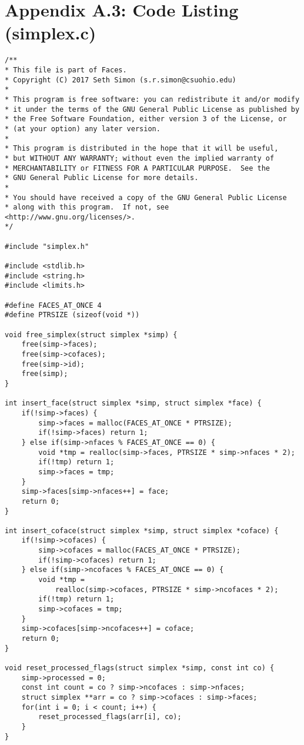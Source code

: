 \documentclass{article}
\begin{document}
\section{Appendix A.3: Code Listing (simplex.c)}
\small
\begin{verbatim}
/**
* This file is part of Faces.
* Copyright (C) 2017 Seth Simon (s.r.simon@csuohio.edu)
* 
* This program is free software: you can redistribute it and/or modify
* it under the terms of the GNU General Public License as published by
* the Free Software Foundation, either version 3 of the License, or
* (at your option) any later version.
* 
* This program is distributed in the hope that it will be useful,
* but WITHOUT ANY WARRANTY; without even the implied warranty of
* MERCHANTABILITY or FITNESS FOR A PARTICULAR PURPOSE.  See the
* GNU General Public License for more details.
* 
* You should have received a copy of the GNU General Public License
* along with this program.  If not, see <http://www.gnu.org/licenses/>.
*/

#include "simplex.h"

#include <stdlib.h>
#include <string.h>
#include <limits.h>

#define FACES_AT_ONCE 4
#define PTRSIZE (sizeof(void *))

void free_simplex(struct simplex *simp) {
    free(simp->faces);
    free(simp->cofaces);
    free(simp->id);
    free(simp);
}

int insert_face(struct simplex *simp, struct simplex *face) {
    if(!simp->faces) {
        simp->faces = malloc(FACES_AT_ONCE * PTRSIZE);
        if(!simp->faces) return 1;
    } else if(simp->nfaces % FACES_AT_ONCE == 0) {
        void *tmp = realloc(simp->faces, PTRSIZE * simp->nfaces * 2);
        if(!tmp) return 1;
        simp->faces = tmp;
    }
    simp->faces[simp->nfaces++] = face;
    return 0;
}

int insert_coface(struct simplex *simp, struct simplex *coface) {
    if(!simp->cofaces) {
        simp->cofaces = malloc(FACES_AT_ONCE * PTRSIZE);
        if(!simp->cofaces) return 1;
    } else if(simp->ncofaces % FACES_AT_ONCE == 0) {
        void *tmp =
            realloc(simp->cofaces, PTRSIZE * simp->ncofaces * 2);
        if(!tmp) return 1;
        simp->cofaces = tmp;
    }
    simp->cofaces[simp->ncofaces++] = coface;
    return 0;
}

void reset_processed_flags(struct simplex *simp, const int co) {
    simp->processed = 0;
    const int count = co ? simp->ncofaces : simp->nfaces;
    struct simplex **arr = co ? simp->cofaces : simp->faces;
    for(int i = 0; i < count; i++) {
        reset_processed_flags(arr[i], co);
    }
}


\end{verbatim}
\end{document}
